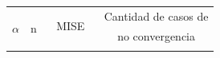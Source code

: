 \begin{table}[hbt]										
	\centering									
	\small									
	\begin{tabular}{cc|ccccc|cccc}									
		\toprule									
		\multirow{3 }{*}{$\alpha$} &\multirow{3 }{*}{ n  } & \multicolumn{5}{c|}{\multirow{2 }{*}{MISE}} & \multicolumn{4}{c}{Cantidad de casos de}\\
		&  &            &            &    &    &         &   \multicolumn{4}{c}{no convergencia}\\
		
		\cmidrule(r){3-7}
		\cmidrule(r){8-11}
		

\end{tabular}
\end{table}
